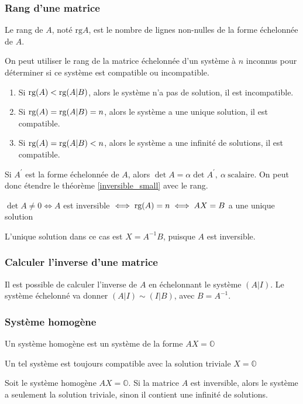 \subsubsection{Rang d'une matrice}
\begin{definition}
    Le rang de $A$, noté $\text{rg}A$, est le nombre de lignes non-nulles de la forme échelonnée de $A$.
\end{definition}
\begin{lemma}
    On peut utiliser le rang de la matrice échelonnée d'un système à $n$ inconnus pour déterminer si ce système est compatible ou incompatible.
    \begin{enumerate}
        \item Si $\textup{rg}(A) < \textup{rg}(A|B)$, alors le système n'a pas de solution, il est incompatible.
        \item Si $\textup{rg}(A) = \textup{rg}(A|B) = n$, alors le système a une unique solution, il est compatible.
        \item Si $\textup{rg}(A) = \textup{rg}(A|B) < n$, alors le système a une infinité de solutions, il est compatible.
    \end{enumerate}
\end{lemma}
\begin{remark}
    Si $A^\prime$ est la forme échelonnée de $A$, alors $\det A = \alpha \det A^\prime, \ \alpha 
 \ \text{scalaire}$.
    On peut donc étendre le théorème \ref{inversible_small} avec le rang.
\end{remark}
\begin{theorem}
    \label{theorem_extended_once}
    $\det A \neq 0 \iff A $ est inversible $\iff \textup{rg}(A) = n \iff AX=B $ a une unique solution
\end{theorem}
\begin{remark}
    L'unique solution dans ce cas est $X = A^{-1}B$, puisque $A$ est inversible.
\end{remark}

\subsubsection{Calculer l'inverse d'une matrice}
Il est possible de calculer l'inverse de $A$ en échelonnant le système $(A|I)$. Le
système échelonné va donner $(A|I) \sim (I|B)$, avec $B = A^{-1}$.

\subsubsection{Système homogène}
\begin{definition}
    Un système homogène est un système de la forme $AX = \mathbb{O}$
\end{definition}
\begin{remark}
    Un tel système est toujours compatible avec la solution triviale $X = \mathbb{O}$
\end{remark}
\begin{theorem}
    Soit le système homogène $AX = \mathbb{O}$. Si la matrice $A$ est inversible, alors le système a seulement la solution triviale, sinon il contient une infinité de solutions.
\end{theorem}

